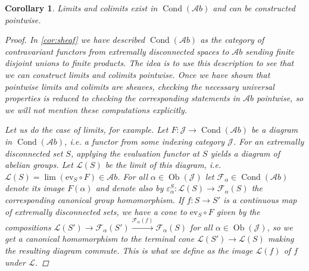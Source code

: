 \documentclass[11pt,A4]{article}
\theoremstyle{plain}
\newtheorem{cor}[thm]{Corollary}
\theoremstyle{definition}
\theoremstyle{remark}
\newcommand{\1}{\mathbbm{1}}
\newcommand{\F}{\mathcal{F}}
\renewcommand{\L}{\mathcal{L}}
\newcommand{\Ab}{\mathscr{A}b}
\DeclareMathOperator{\Cond}{Cond}
\DeclareMathOperator{\Ob}{Ob}
\newcommand{\ev}{\mathrm{ev}}
\begin{document}
\begin{cor}\label{cor:limits}
    Limits and colimits exist in $\Cond(\Ab)$ and can be constructed pointwise.
    \begin{proof}
	In \cref{cor:sheaf} we have described $\Cond(\Ab)$ as the category of contravariant functors from extremally disconnected spaces to $\Ab$ sending finite disjoint unions to finite products.
	The idea is to use this description to see that we can construct limits and colimits pointwise.
	Once we have shown that pointwise limits and colimits are sheaves, checking the necessary universal properties is reduced to checking the corresponding statements in $\Ab$ pointwise, so we will not mention these computations explicitly.
	
	Let us do the case of limits, for example.
	Let $F\colon \mathscr{J}\to \Cond(\Ab)$ be a diagram in $\Cond(\Ab)$, i.e. a functor from some indexing category $\mathscr{J}$.
	For an extremally disconnected set $S$, applying the evaluation functor at $S$ yields a diagram of abelian groups.
	Let $\L(S)$ be the limit of this diagram, i.e. $\L(S)=\lim(\ev_{S}\circ F)\in\Ab$.
	For all $\alpha \in \Ob(\mathscr{J})$ let $\F_{\alpha}\in \Cond(\Ab)$ denote its image $F(\alpha)$ and denote also by $\varepsilon^{S}_{\alpha}\colon \L(S)\to \F_{\alpha}(S)$ the corresponding canonical group homomorphism.
	If $f\colon S\to S'$ is a continuous map of extremally disconnected sets, we have a cone to $\ev_{S}\circ F$ given by the compositions $\L(S')\to \F_{\alpha}(S')\xrightarrow{\F_{\alpha}(f)} \F_{\alpha}(S)$ for all $\alpha\in\Ob(\mathscr{J})$, so we get a canonical homomorphism to the terminal cone $\L(S')\to \L(S)$ making the resulting diagram commute.
	This is what we define as the image $\L(f)$ of $f$ under $\L$.


\end{proof}
\end{cor}
\end{document}
